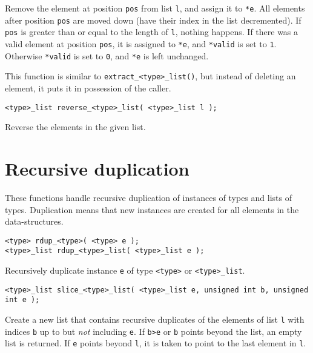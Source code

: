 \begin{desc}
Remove the element at position {\tt pos} from list {\tt l},
and assign it to \verb'*e'.
All elements after position {\tt pos} are moved down
(have their index in the list decremented).
If {\tt pos} is greater than or equal to the length of {\tt l},
nothing happens.
If there was a valid element at position {\tt pos}, it is assigned
to \verb'*e', and \verb'*valid' is set to {\tt 1}. Otherwise
\verb'*valid' is set to {\tt 0}, and \verb'*e' is left unchanged.
\par
This function is similar to \verb'extract_<type>_list()', but instead
of deleting an element, it puts it in possession of the caller.
\end{desc}
\begin{verbatim}
<type>_list reverse_<type>_list( <type>_list l );
\end{verbatim}
\begin{desc}
Reverse the elements in the given list.
\end{desc}
\section{Recursive duplication}
These functions handle recursive duplication of instances of types and
lists of types.
Duplication means that new instances are created for all elements
in the data-structures.
\begin{verbatim}
<type> rdup_<type>( <type> e );
<type>_list rdup_<type>_list( <type>_list e );
\end{verbatim}
\begin{desc}
Recursively duplicate instance {\tt e} of type {\tt <type>} or
{\tt <type>\_list}.
\end{desc}
\begin{verbatim}
<type>_list slice_<type>_list( <type>_list e, unsigned int b, unsigned int e );
\end{verbatim}
\begin{desc}
Create a new list that contains recursive duplicates of the elements of
list {\tt l} with indices {\tt b} up to but {\em not} \/including {\tt e}.
If {\tt b>e} or {\tt b} points beyond the list,
an empty list is returned.
If {\tt e} points beyond {\tt l},
it is taken to point to the last element in {\tt l}.
\end{desc}
